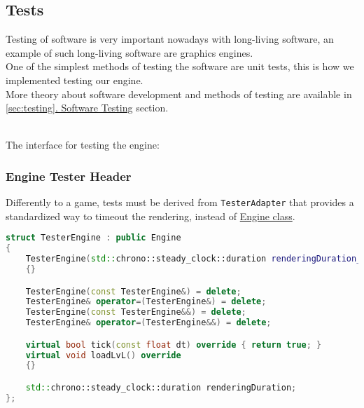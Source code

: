 \newpage
\subsection{Tests}
\label{sec:tests}
\hspace{\parindent}Testing of software is very important nowadays with long-living software, an example of such long-living software are graphics engines.\\
One of the simplest methods of testing the software are unit tests, this is how we implemented testing our engine.\\
More theory about software development and methods of testing are available in \hyperref[sec:testing]{\ref*{sec:testing}. Software Testing} section.

\noindent \\The interface for testing the engine:
\subsubsection{Engine Tester Header}
\label{sec:tester_adapter}
Differently to a game, tests must be derived from \texttt{TesterAdapter} that provides a standardized way to timeout the rendering, instead of \hyperref[lst:engine_class]{Engine class}. 
\begin{lstlisting}[language=c++, caption=Tester Engine class (./engine/tests/tester.cpp)]
struct TesterEngine : public Engine
{
    TesterEngine(std::chrono::steady_clock::duration renderingDuration_) : renderingDuration{renderingDuration_}
    {}

    TesterEngine(const TesterEngine&) = delete;
    TesterEngine& operator=(TesterEngine&) = delete;
    TesterEngine(const TesterEngine&&) = delete;
    TesterEngine& operator=(TesterEngine&&) = delete;

    virtual bool tick(const float dt) override { return true; }
    virtual void loadLvL() override
    {}

    std::chrono::steady_clock::duration renderingDuration;
};
\end{lstlisting}



